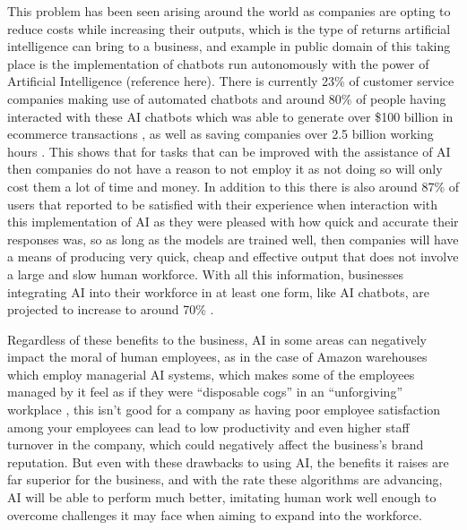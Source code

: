 \documentclass[]{final_report}
\begin{document}
This problem has been seen arising around the world as companies are opting to reduce costs while increasing their outputs, which is the type of returns artificial intelligence can bring to a business, and example in public domain of this taking place is the implementation of chatbots run autonomously with the power of Artificial Intelligence (reference here). There is currently 23\% of customer service companies making use of automated chatbots and around 80\% of people having interacted with these AI chatbots which was able to generate over \$100 billion in ecommerce transactions \cite{Repai2024}, as well as saving companies over 2.5 billion working hours \cite{Chatbot2025}.  This shows that for tasks that can be improved with the assistance of AI then companies do not have a reason to not employ it as not doing so will only cost them a lot of time and money. In addition to this there is also around 87\% of users that reported to be satisfied with their experience when interaction with this implementation of AI \cite{CustomerAI2025}  as they were pleased with how quick and accurate their responses was, so as long as the models are trained well, then companies will have a means of producing very quick, cheap  and effective output that does not involve a large and slow human workforce. With all this information, businesses integrating AI into their workforce in at least one form, like AI chatbots, are projected to increase to around 70\% \cite{Nexford2024}. 

Regardless of these benefits to the business, AI in some areas can negatively impact the moral of human employees, as in the case of Amazon warehouses which employ managerial AI systems, which makes some of the employees managed by it feel as if they were “disposable cogs” in an “unforgiving” workplace \cite{APAPsych2025},  this isn't good for a company as having poor employee satisfaction among your employees can lead to low productivity and even higher staff turnover in the company, which could negatively affect the business’s brand reputation. But even with these drawbacks to using AI, the benefits it raises are far superior for the business, and with the rate these algorithms are advancing, AI will be able to perform much better, imitating human work well enough to overcome challenges it may face when aiming to expand into the workforce. 
\end{document}
